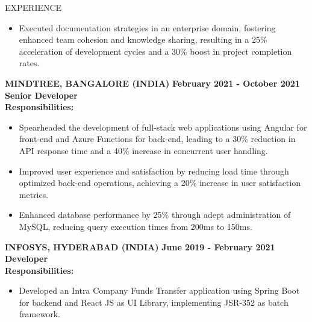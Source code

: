 \documentclass{resume} %
\begin{document}
\begin{rSection}{EXPERIENCE}
\begin{flushleft}
\begin{itemize}
                                    \item Executed documentation strategies in an enterprise domain, fostering enhanced team cohesion and knowledge sharing, resulting in a 25\% acceleration of development cycles and a 30\% boost in project completion rates.
                            \end{itemize}
            \vspace{0.5em}
            \textbf{MINDTREE, BANGALORE (INDIA)} \hfill \textbf{February 2021 {-} October 2021} \\
            \textbf{Senior Developer} \\
            \vspace{1em}
            \textbf{Responsibilities:} \\
            \begin{itemize}
                                    \item Spearheaded the development of full{-}stack web applications using Angular for front{-}end and Azure Functions for back{-}end, leading to a 30\% reduction in API response time and a 40\% increase in concurrent user handling.
                                    \item Improved user experience and satisfaction by reducing load time through optimized back{-}end operations, achieving a 20\% increase in user satisfaction metrics.
                                    \item Enhanced database performance by 25\% through adept administration of MySQL, reducing query execution times from 200ms to 150ms.
                            \end{itemize}
            \vspace{0.5em}
            \textbf{INFOSYS, HYDERABAD (INDIA)} \hfill \textbf{June 2019 {-} February 2021} \\
            \textbf{Developer} \\
            \vspace{1em}
            \textbf{Responsibilities:} \\
            \begin{itemize}
                                    \item Developed an Intra Company Funds Transfer application using Spring Boot for backend and React JS as UI Library, implementing JSR{-}352 as batch framework.

\end{itemize}
\end{flushleft}
\end{rSection}
\end{document}
